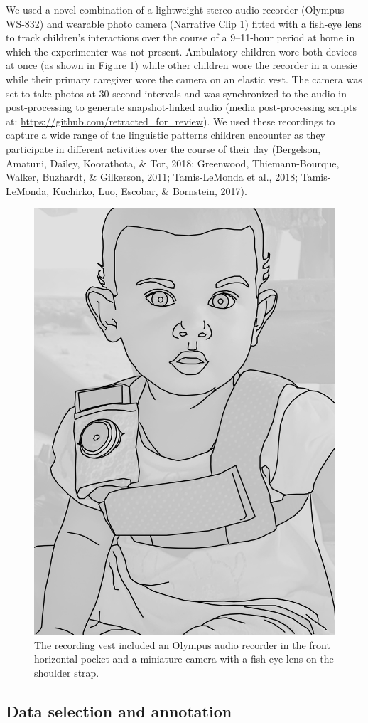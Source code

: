 \documentclass[floatsintext,man]{apa6}
\theoremstyle{definition}
\theoremstyle{definition}
\theoremstyle{definition}
\theoremstyle{remark}
\begin{document}
We used a novel combination of a lightweight stereo audio recorder
(Olympus WS-832) and wearable photo camera (Narrative Clip 1) fitted
with a fish-eye lens to track children's interactions over the course of
a 9--11-hour period at home in which the experimenter was not present.
Ambulatory children wore both devices at once (as shown in
\protect\hyperlink{fig1}{Figure 1}) while other children wore the
recorder in a onesie while their primary caregiver wore the camera on an
elastic vest. The camera was set to take photos at 30-second intervals
and was synchronized to the audio in post-processing to generate
snapshot-linked audio (media post-processing scripts at:
\url{https://github.com/retracted_for_review}). We used these recordings
to capture a wide range of the linguistic patterns children encounter as
they participate in different activities over the course of their day
(Bergelson, Amatuni, Dailey, Koorathota, \& Tor, 2018; Greenwood,
Thiemann-Bourque, Walker, Buzhardt, \& Gilkerson, 2011; Tamis-LeMonda et
al., 2018; Tamis-LeMonda, Kuchirko, Luo, Escobar, \& Bornstein, 2017).

\begin{figure}

{\centering \includegraphics[width=0.3\linewidth]{Tseltal-CLE_files/TseltalCLE-RecordingVest} 

}

\caption{The recording vest included an Olympus audio recorder in the front horizontal pocket and a miniature camera with a fish-eye lens on the shoulder strap.}\label{fig:fig1}
\end{figure}

\subsection{Data selection and annotation}\label{methods-samples}
\end{document}

